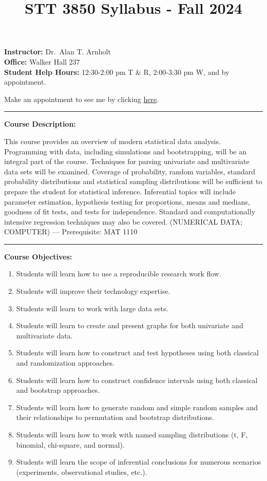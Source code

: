 \documentclass[
]{article}
\title{STT 3850 Syllabus - Fall 2024}
\author{}
\date{\vspace{-2.5em}}
\providecommand{\tightlist}{%
  \setlength{\itemsep}{0pt}\setlength{\parskip}{0pt}}
\begin{document}
\maketitle

\textbf{Instructor:} Dr.~Alan T. Arnholt\\
\textbf{Office:} Walker Hall 237\\
\textbf{Student Help Hours:} 12:30-2:00 pm T \& R, 2:00-3:30 pm W, and
by appointment.

Make an appointment to see me by clicking
\href{https://calendar.app.google/2UnDLo1n8SBobRv5A}{here}.

\begin{center}\rule{0.5\linewidth}{0.5pt}\end{center}

\textbf{Course Description:}

This course provides an overview of modern statistical data analysis.
Programming with data, including simulations and bootstrapping, will be
an integral part of the course. Techniques for parsing univariate and
multivariate data sets will be examined. Coverage of probability, random
variables, standard probability distributions and statistical sampling
distributions will be sufficient to prepare the student for statistical
inference. Inferential topics will include parameter estimation,
hypothesis testing for proportions, means and medians, goodness of fit
tests, and tests for independence. Standard and computationally
intensive regression techniques may also be covered. (NUMERICAL DATA;
COMPUTER) --- Prerequisite: MAT 1110

\begin{center}\rule{0.5\linewidth}{0.5pt}\end{center}

\textbf{Course Objectives:}

\begin{enumerate}
\def\labelenumi{\arabic{enumi}.}
\tightlist
\item
  Students will learn how to use a reproducible research work flow.
\item
  Students will improve their technology expertise.
\item
  Students will learn to work with large data sets.
\item
  Students will learn to create and present graphs for both univariate
  and multivariate data.
\item
  Students will learn how to construct and test hypotheses using both
  classical and randomization approaches.
\item
  Students will learn how to construct confidence intervals using both
  classical and bootstrap approaches.
\item
  Students will learn how to generate random and simple random samples
  and their relationships to permutation and bootstrap distributions.
\item
  Students will learn how to work with named sampling distributions (t,
  F, binomial, chi-square, and normal).
\item
  Students will learn the scope of inferential conclusions for numerous
  scenarios (experiments, observational studies, etc.).
\end{enumerate}
\end{document}
